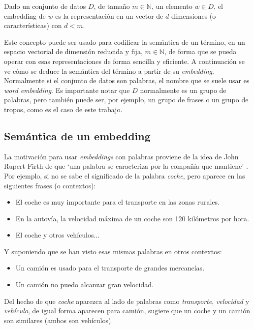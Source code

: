 \begin{definition}
    Dado un conjunto de datos $D$, de tamaño $m\in\mathbb{N}$, un elemento $w\in D$, el embedding de $w$ es
    la representación en un vector de $d$ dimensiones (o características) con $d<m$.
\end{definition}

Este concepto puede ser usado para codificar la semántica de un término, en un espacio vectorial de dimensión reducida
y fija, $m \in \mathbb{N}$, de forma que se pueda operar con esas representaciones de forma sencilla y eficiente. A continuación se ve cómo
se deduce la semántica del término a partir de su \textit{embedding}. Normalmente si el conjunto de datos son palabras, el nombre
que se suele usar es \textit{word embedding}. Es importante notar que $D$ normalmente es un grupo de palabras, pero también puede ser,
por ejemplo, un grupo de frases \cite{lin2017structured} o un grupo de tropos, como es el caso de este trabajo.

\subsection*{Semántica de un embedding}

La motivación para usar \textit{embeddings} con palabras proviene de la idea de John Rupert
Firth de que `una palabra se caracteriza por la compañía que mantiene' \cite{firth1957synopsis}. Por ejemplo, si no se sabe
el significado de la palabra \textit{coche}, pero aparece en las siguientes frases (o contextos):
\begin{itemize}
    \item El coche es muy importante para el transporte en las zonas rurales.
    \item En la autovía, la velocidad máxima de un coche son 120 kilómetros por hora.
    \item El coche y otros vehículos...
\end{itemize}
Y suponiendo que se han visto esas mismas palabras en otros contextos:
\begin{itemize}
    \item Un camión es usado para el transporte de grandes mercancías.
    \item Un camión no puedo alcanzar gran velocidad.
\end{itemize}
Del hecho de que \textit{coche} aparezca al lado de palabras como \textit{transporte}, \textit{velocidad} y \textit{vehículo},
de igual forma aparecen para camión, sugiere que un coche y un camión son similares (ambos son vehículos).

